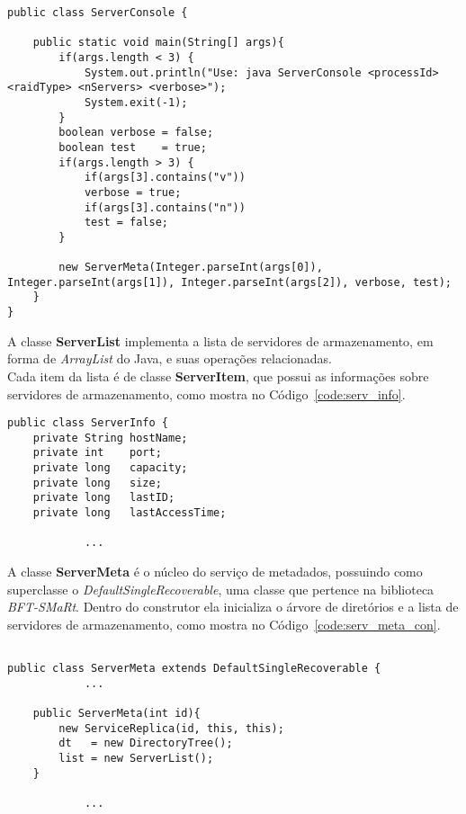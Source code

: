 \begin{lstlisting}[basicstyle=\ttfamily\footnotesize, frame=single, caption=Classe ServerConsole, label=code:meta_con]	
public class ServerConsole {
	
	public static void main(String[] args){
		if(args.length < 3) {
			System.out.println("Use: java ServerConsole <processId> <raidType> <nServers> <verbose>");
			System.exit(-1);
		}
		boolean verbose = false;
		boolean test    = true;
		if(args.length > 3) {
			if(args[3].contains("v"))
			verbose = true;
			if(args[3].contains("n"))
			test = false;
		}
		
		new ServerMeta(Integer.parseInt(args[0]), Integer.parseInt(args[1]), Integer.parseInt(args[2]), verbose, test);
	}
}
\end{lstlisting}	

A classe \textbf{ServerList} implementa a lista de servidores de armazenamento, em forma de \textit{ArrayList} do Java, e suas operações relacionadas.
\\

Cada item da lista é de classe \textbf{ServerItem}, que possui as informações sobre servidores de armazenamento, como mostra no Código~\ref{code:serv_info}.

\begin{lstlisting}[basicstyle=\ttfamily\footnotesize, frame=single, caption=Campos da classe ServerInfo, label=code:serv_info]	
public class ServerInfo {
	private String hostName;
	private int    port;
	private long   capacity;
	private long   size;
	private long   lastID;
	private long   lastAccessTime;

			...
\end{lstlisting}	

A classe \textbf{ServerMeta} é o núcleo do serviço de metadados, possuindo como superclasse o \textit{DefaultSingleRecoverable}, uma classe que pertence na biblioteca \textit{BFT-SMaRt}.
Dentro do construtor ela inicializa o árvore de diretórios e a lista de servidores de armazenamento, como mostra no Código~\ref{code:serv_meta_con}.

\begin{lstlisting}[basicstyle=\ttfamily\footnotesize, frame=single, caption=Declaração e construtor da classe ServerMeta, label=code:serv_meta_con]

public class ServerMeta extends DefaultSingleRecoverable {
			...
		
	public ServerMeta(int id){
		new ServiceReplica(id, this, this);
		dt   = new DirectoryTree();
		list = new ServerList(); 
	}

			...
\end{lstlisting}	

